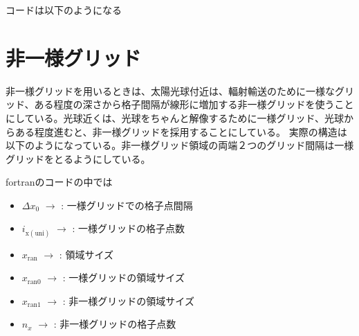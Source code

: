 \documentclass[letterpaper,10pt,dvipdfmx,report]{sphinxmanual}
\begin{document}
コードは以下のようになる

\begin{sphinxVerbatim}[commandchars=\\\{\}]
  
    
   
  
            
\end{sphinxVerbatim}


\section{非一様グリッド}
\label{\detokenize{geometry:id3}}
非一様グリッドを用いるときは、太陽光球付近は、輻射輸送のために一様なグリッド、ある程度の深さから格子間隔が線形に増加する非一様グリッドを使うことにしている。光球近くは、光球をちゃんと解像するために一様グリッド、光球からある程度進むと、非一様グリッドを採用することにしている。
実際の構造は以下のようになっている。非一様グリッド領域の両端２つのグリッド間隔は一様グリッドをとるようにしている。

fortranのコードの中では
\begin{itemize}
\item {} 
\(\Delta x_0\) \(\rightarrow\)  : 一様グリッドでの格子点間隔

\item {} 
\(i_\mathrm{x\left(uni\right)}\) \(\rightarrow\) : 一様グリッドの格子点数

\item {} 
\(x_\mathrm{ran}\) \(\rightarrow\) : 領域サイズ

\item {} 
\(x_\mathrm{ran0}\) \(\rightarrow\) : 一様グリッドの領域サイズ

\item {} 
\(x_\mathrm{ran1}\) \(\rightarrow\) : 非一様グリッドの領域サイズ

\item {} 
\(n_x\) \(\rightarrow\)  : 非一様グリッドの格子点数

\end{itemize}
\end{document}
